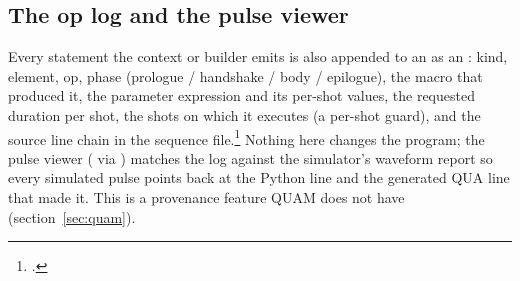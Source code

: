 \subsection{The op log and the pulse viewer}

Every statement the context or builder emits is also appended to an
 as an : kind, element, op, phase (prologue /
handshake / body / epilogue), the macro that produced it, the parameter
expression and its per-shot values, the requested duration per shot, the
shots on which it executes (a per-shot  guard), and the source line
chain in the sequence file.\footnote{.}
Nothing here changes the program; the pulse viewer (
via ) matches the log against the simulator's
waveform report so every simulated pulse points back at the Python line and
the generated QUA line that made it. This is a provenance feature QUAM does
not have (section~\ref{sec:quam}).

